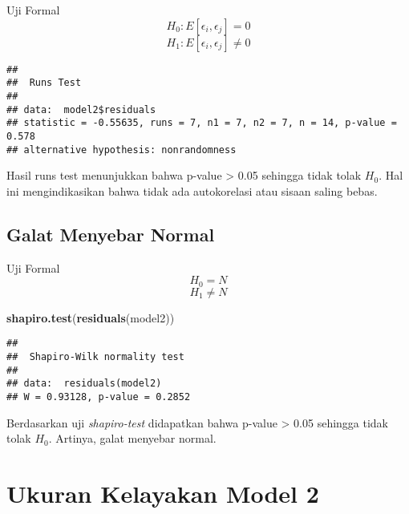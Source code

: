 \documentclass[
]{article}
\newenvironment{Shaded}{\begin{snugshade}}{\end{snugshade}}
\newcommand{\FunctionTok}[1]{\textcolor[rgb]{0.13,0.29,0.53}{\textbf{#1}}}
\newcommand{\NormalTok}[1]{#1}
\newcommand{\OtherTok}[1]{\textcolor[rgb]{0.56,0.35,0.01}{#1}}
\newcommand{\SpecialCharTok}[1]{\textcolor[rgb]{0.81,0.36,0.00}{\textbf{#1}}}
\begin{document}
Uji Formal \[H_0: E[\epsilon_i, \epsilon_j] = 0\]
\[H_1: E[\epsilon_i, \epsilon_j] \neq 0\]

\begin{Shaded}
\end{Shaded}

\begin{verbatim}
## 
##  Runs Test
## 
## data:  model2$residuals
## statistic = -0.55635, runs = 7, n1 = 7, n2 = 7, n = 14, p-value = 0.578
## alternative hypothesis: nonrandomness
\end{verbatim}

Hasil runs test menunjukkan bahwa p-value \textgreater{} 0.05 sehingga
tidak tolak \(H_0\). Hal ini mengindikasikan bahwa tidak ada
autokorelasi atau sisaan saling bebas.

\hypertarget{galat-menyebar-normal-1}{%
\subsection{Galat Menyebar Normal}\label{galat-menyebar-normal-1}}

Uji Formal \[H_0 = N\] \[H_1 \neq N\]

\begin{Shaded}
\begin{Highlighting}[]
\FunctionTok{shapiro.test}\NormalTok{(}\FunctionTok{residuals}\NormalTok{(model2))}
\end{Highlighting}
\end{Shaded}

\begin{verbatim}
## 
##  Shapiro-Wilk normality test
## 
## data:  residuals(model2)
## W = 0.93128, p-value = 0.2852
\end{verbatim}

Berdasarkan uji \emph{shapiro-test} didapatkan bahwa p-value
\textgreater{} 0.05 sehingga tidak tolak \(H_0\). Artinya, galat
menyebar normal.

\hypertarget{ukuran-kelayakan-model-2}{%
\section{Ukuran Kelayakan Model 2}\label{ukuran-kelayakan-model-2}}

\begin{Shaded}
\end{Shaded}
\end{document}
